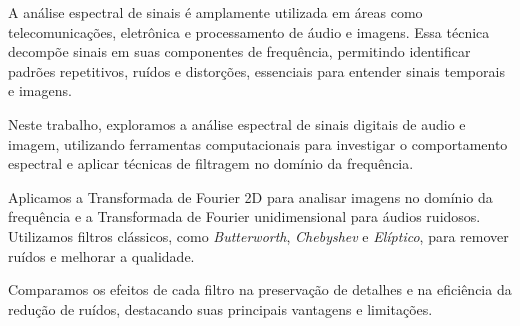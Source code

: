A análise espectral de sinais é amplamente utilizada em áreas como telecomunicações, eletrônica e processamento de áudio e imagens. Essa técnica decompõe sinais em suas componentes de frequência, permitindo identificar padrões repetitivos, ruídos e distorções, essenciais para entender sinais temporais e imagens.

Neste trabalho, exploramos a análise espectral de sinais digitais de audio e imagem, utilizando ferramentas computacionais para investigar o comportamento espectral e aplicar técnicas de filtragem no domínio da frequência.

Aplicamos a Transformada de Fourier 2D para analisar imagens no domínio da frequência e a Transformada de Fourier unidimensional para áudios ruidosos. Utilizamos filtros clássicos, como \textit{Butterworth}, \textit{Chebyshev} e \textit{Elíptico}, para remover ruídos e melhorar a qualidade.

Comparamos os efeitos de cada filtro na preservação de detalhes e na eficiência da redução de ruídos, destacando suas principais vantagens e limitações.

